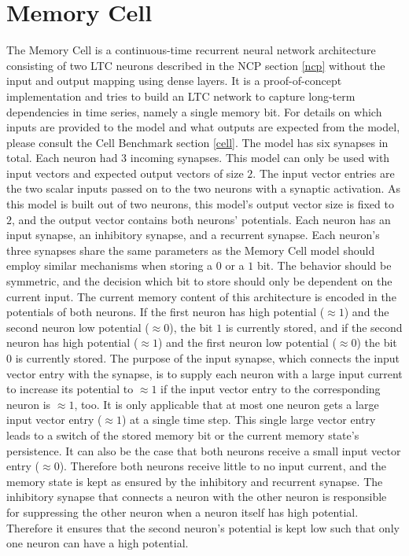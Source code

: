 \documentclass[draft,final]{vutinfth} %
\begin{document}
\section{Memory Cell} \label{memory_cell}
The Memory Cell is a continuous-time recurrent neural network architecture consisting of two LTC neurons described in the NCP section \ref{ncp} without the input and output mapping using dense layers.
It is a proof-of-concept implementation and tries to build an LTC network \cite{LTCNetworks} to capture long-term dependencies in time series, namely a single memory bit.
For details on which inputs are provided to the model and what outputs are expected from the model, please consult the Cell Benchmark section \ref{cell}.
The model has six synapses in total. Each neuron had $3$ incoming synapses.
This model can only be used with input vectors and expected output vectors of size $2$.
The input vector entries are the two scalar inputs passed on to the two neurons with a synaptic activation.
As this model is built out of two neurons, this model's output vector size is fixed to $2$, and the output vector contains both neurons' potentials.
Each neuron has an input synapse, an inhibitory synapse, and a recurrent synapse.
Each neuron's three synapses share the same parameters as the Memory Cell model should employ similar mechanisms when storing a $0$ or a $1$ bit.
The behavior should be symmetric, and the decision which bit to store should only be dependent on the current input.
The current memory content of this architecture is encoded in the potentials of both neurons.
If the first neuron has high potential ($\approx 1$) and the second neuron low potential ($\approx 0$), the bit $1$ is currently stored, and if the second neuron has high potential ($\approx 1$) and the first neuron low potential ($\approx 0$) the bit $0$ is currently stored.
The purpose of the input synapse, which connects the input vector entry with the synapse, is to supply each neuron with a large input current to increase its potential to $\approx 1$ if the input vector entry to the corresponding neuron is $\approx 1$, too.
It is only applicable that at most one neuron gets a large input vector entry ($\approx 1$) at a single time step.
This single large vector entry leads to a switch of the stored memory bit or the current memory state's persistence.
It can also be the case that both neurons receive a small input vector entry ($\approx 0$). Therefore both neurons receive little to no input current, and the memory state is kept as ensured by the inhibitory and recurrent synapse.
The inhibitory synapse that connects a neuron with the other neuron is responsible for suppressing the other neuron when a neuron itself has high potential. Therefore it ensures that the second neuron's potential is kept low such that only one neuron can have a high potential.
\end{document}
